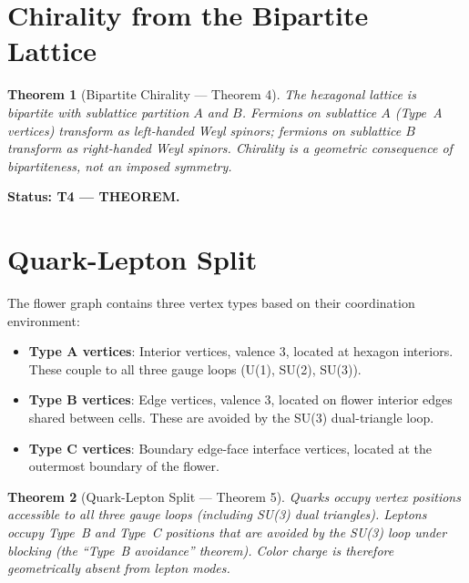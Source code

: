 \documentclass[11pt,letterpaper]{article}
\newtheorem{theorem}{Theorem}[section]
\begin{document}
\section{Chirality from the Bipartite Lattice}

\begin{theorem}[Bipartite Chirality --- Theorem 4]\label{thm:T4}
The hexagonal lattice is bipartite with sublattice partition $A$ and $B$.
Fermions on sublattice $A$ (Type~A vertices) transform as left-handed Weyl
spinors; fermions on sublattice $B$ transform as right-handed Weyl spinors.
Chirality is a geometric consequence of bipartiteness, not an imposed
symmetry.
\end{theorem}

\textbf{Status: T4 --- THEOREM.}

\section{Quark-Lepton Split}

The flower graph contains three vertex types based on their
coordination environment:

\begin{itemize}[nosep]
  \item \textbf{Type A vertices}: Interior vertices, valence 3, located at hexagon
        interiors.  These couple to all three gauge loops (U(1), SU(2), SU(3)).
  \item \textbf{Type B vertices}: Edge vertices, valence 3, located on flower
        interior edges shared between cells.  These are avoided by the
        SU(3) dual-triangle loop.
  \item \textbf{Type C vertices}: Boundary edge-face interface vertices,
        located at the outermost boundary of the flower.
\end{itemize}

\begin{theorem}[Quark-Lepton Split --- Theorem 5]\label{thm:T5}
Quarks occupy vertex positions accessible to all three gauge loops
(including SU(3) dual triangles).  Leptons occupy Type~B and Type~C
positions that are avoided by the SU(3) loop under blocking (the
``Type~B avoidance'' theorem).  Color charge is therefore geometrically
absent from lepton modes.
\end{theorem}
\end{document}
